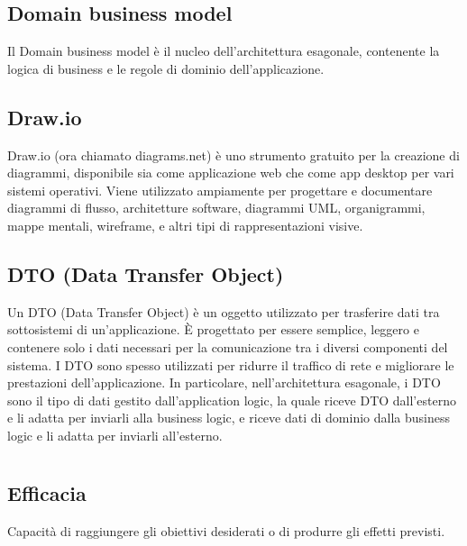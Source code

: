 \hypertarget{sec:domain business model}{}
\subsection*{Domain business model}
Il Domain business model è il nucleo dell'architettura esagonale, contenente la logica di business e le regole di dominio dell'applicazione.


\subsection*{Draw.io}
Draw.io (ora chiamato diagrams.net) è uno strumento gratuito per la creazione di diagrammi, disponibile sia come applicazione web che come app desktop per 
vari sistemi operativi. Viene utilizzato ampiamente per progettare e documentare diagrammi di flusso, architetture software, diagrammi UML, organigrammi, 
mappe mentali, wireframe, e altri tipi di rappresentazioni visive.

\hypertarget{sec:dto}{}
\subsection*{DTO (Data Transfer Object)}
Un DTO (Data Transfer Object) è un oggetto utilizzato per trasferire dati tra sottosistemi di un'applicazione. È progettato per essere semplice, leggero e
contenere solo i dati necessari per la comunicazione tra i diversi componenti del sistema. I DTO sono spesso utilizzati per ridurre il traffico di rete e
migliorare le prestazioni dell'applicazione. In particolare, nell'architettura esagonale, i DTO sono il tipo di dati gestito dall'application logic,
la quale riceve DTO dall'esterno e li adatta per inviarli alla business logic, e riceve dati di dominio dalla business logic e li adatta per inviarli
all'esterno.

\newpage



\section{}

\hypertarget{sec:efficacia}{}
\subsection*{Efficacia}
Capacità di raggiungere gli obiettivi desiderati o di produrre gli effetti previsti.

